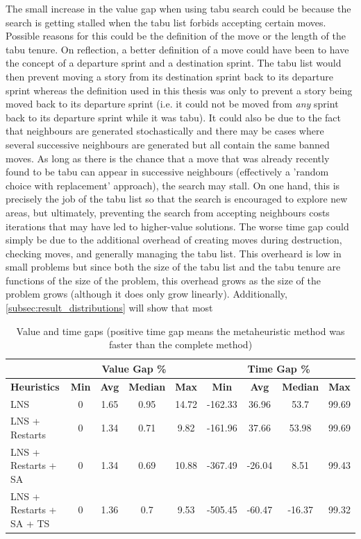 The small increase in the value gap when using tabu search could be because the search is getting stalled when the tabu list forbids accepting certain moves. Possible reasons for this could be the definition of the move or the length of the tabu tenure. On reflection, a better definition of a move could have been to have the concept of a departure sprint and a destination sprint. The tabu list would then prevent moving a story from its destination sprint back to its departure sprint whereas the definition used in this thesis was only to prevent a story being moved back to its departure sprint (i.e. it could not be moved from \emph{any} sprint back to its departure sprint while it was tabu). It could also be due to the fact that neighbours are generated stochastically and there may be cases where several successive neighbours are generated but all contain the same banned moves. As long as there is the chance that a move that was already recently found to be tabu can appear in successive neighbours (effectively a 'random choice with replacement' approach), the search may stall. On one hand, this is precisely the job of the tabu list so that the search is encouraged to explore new areas, but ultimately, preventing the search from accepting neighbours costs iterations that may have led to higher-value solutions. The worse time gap could simply be due to the additional overhead of creating moves during destruction, checking moves, and generally managing the tabu list. This overheard is low in small problems but since both the size of the tabu list and the tabu tenure are functions of the size of the problem, this overhead grows as the size of the problem grows (although it does only grow linearly). Additionally, \cref{subsec:result_distributions} will show that most 

\begin{table}[h!]
\centering

\begin{tabular}{|l|c|c|c|c|c|c|c|c|}
\hline
 & \multicolumn{4}{c|}{\textbf{Value Gap \%}} & \multicolumn{4}{c|}{\textbf{Time Gap \%}} \\ \hline
\textbf{Heuristics} & \textbf{Min} & \textbf{Avg} & \textbf{Median} & \textbf{Max} & \textbf{Min} & \textbf{Avg} & \textbf{Median} & \textbf{Max} \\ \hline
LNS & 0 & 1.65 & 0.95 & 14.72 & -162.33 & 36.96 & 53.7 & 99.69 \\ \hline
LNS + Restarts & 0 & 1.34 & 0.71 & 9.82 & -161.96 & 37.66 & 53.98 & 99.69 \\ \hline
LNS + Restarts + SA & 0 & 1.34 & 0.69 & 10.88 & -367.49 & -26.04 & 8.51 & 99.43 \\ \hline
LNS + Restarts + SA + TS & 0 & 1.36 & 0.7 & 9.53 & -505.45 & -60.47 & -16.37 & 99.32 \\ \hline
\end{tabular}
\caption{Value and time gaps (positive time gap means the metaheuristic method was faster than the complete method)}
\label{heuristic_gaps}
\end{table}

